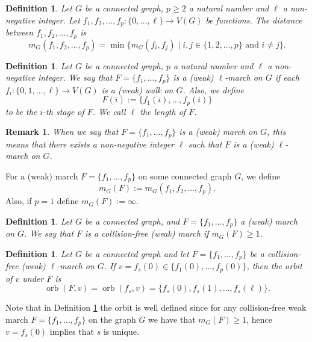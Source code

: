 \documentclass{article}
\newtheorem{definition}[theorem]{Definition}
\newtheorem{remark}[theorem]{Remark}
\DeclareMathOperator{\orb}{\mathrm{orb}}
\begin{document}
\begin{definition}\label{def:distance-multiple-tracks}
Let $G$ be a connected graph, $p\geq 2$ a natural number and $\ell$ a non-negative integer. Let $f_1, f_2, \ldots, f_p:\{0,\ldots,\ell\}\rightarrow V(G)$ be functions. The distance between $f_1, f_2, \ldots, f_p$ is 
\[
    m_G(f_1, f_2, \ldots, f_p) = \min\{ m_G(f_i, f_j) \mid i,j\in \{1, 2, \ldots, p\} \text{ and } i\not=j  \}.
\]
\end{definition}

\begin{definition}
Let $G$ be a connected graph, $p$ a natural number and $\ell$ a non-negative integer. We say that $F=\{f_1,\ldots,f_p\}$ is a \emph{(weak) $\ell$-march} on $G$ if each $f_i:\{0,1,\ldots,\ell\}\rightarrow V(G)$ is a (weak) walk on $G$. Also, we define \[F(i):=\{f_1(i),\ldots,f_p(i)\} \] to be the \emph{$i$-th stage of $F$.} We call $\ell$ the length of $F$.
\end{definition}

\begin{remark}
When we say that $F=\{f_1,\ldots,f_p\}$ is a (weak) march on $G$, this means that there exists a non-negative integer $\ell$ such that $F$ is a (weak) $\ell$-march on $G$.
\end{remark}

For a (weak) march $F=\{f_1,\ldots,f_p\}$ on some connected graph $G$, we define 
$$m_G(F):=m_G(f_1, f_2, \ldots, f_p).$$ Also, if $p=1$ define $m_G(F):=\infty$.

\begin{definition}
Let $G$ be a connected graph, and $F=\{f_1,\ldots,f_p\}$ a (weak) march on $G$. We say that $F$ is a \emph{collision-free} (weak) march if $m_G(F)\geq 1$.
\end{definition}


\begin{definition}\label{def:orbit}
Let $G$ be a connected graph and let $F=\{f_1,\ldots,f_p\}$ be a collision-free (weak) $\ell$-march on $G$. If $v=f_s(0)\in\{f_1(0),\ldots,f_p(0)\}$, then the
\emph{orbit of $v$ under $F$} is 
\[\orb(F,v)=\orb(f_s,v)=\{f_s(0),f_s(1),\ldots,f_s(\ell)\}.\]
\end{definition} 

Note that in Definition \ref{def:orbit} the orbit is well defined since for any collision-free weak march $F=\{f_1,\ldots,f_p\}$ on the graph $G$ we have that $m_G(F)\geq 1$, hence $v=f_s(0)$ implies that $s$ is unique.
\end{document}
